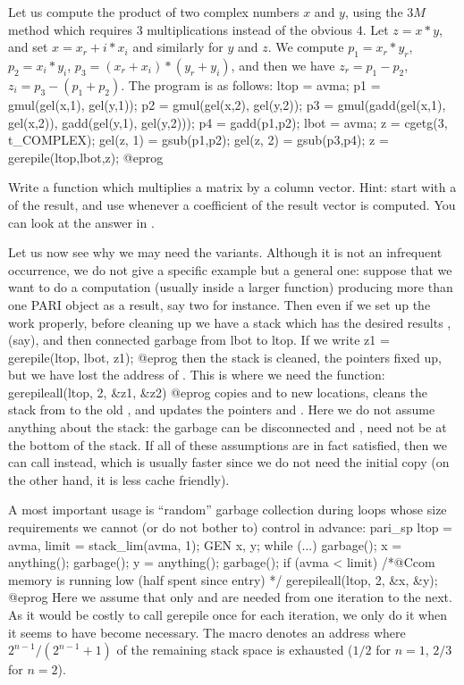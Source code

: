  Let us compute the product of two complex
numbers $x$ and $y$, using the $3M$ method which requires 3 multiplications
instead of the obvious 4. Let $z = x*y$, and set $x = x_r + i*x_i$ and
similarly for $y$ and $z$. We compute $p_1 = x_r*y_r$, $p_2=x_i*y_i$,
$p_3=(x_r+x_i)*(y_r+y_i)$, and then we have $z_r=p_1-p_2$,
$z_i=p_3-(p_1+p_2)$. The program is as follows:
%
\bprog
ltop = avma;
p1 = gmul(gel(x,1), gel(y,1));
p2 = gmul(gel(x,2), gel(y,2));
p3 = gmul(gadd(gel(x,1), gel(x,2)), gadd(gel(y,1), gel(y,2)));
p4 = gadd(p1,p2);
lbot = avma; z = cgetg(3, t_COMPLEX);
gel(z, 1) = gsub(p1,p2);
gel(z, 2) = gsub(p3,p4); z = gerepile(ltop,lbot,z);
@eprog

 Write a function which multiplies a matrix by a column
vector. Hint: start with a  of the result, and use 
whenever a coefficient of the result vector is computed. You can look at the
answer in .


Let us now see why we may need the  variants. Although it
is not an infrequent occurrence, we do not give a specific example but a
general one: suppose that we want to do a computation (usually inside a
larger function) producing more than one PARI object as a result, say two for
instance. Then even if we set up the work properly, before cleaning up we
have a stack which has the desired results ,  (say), and
then connected garbage from lbot to ltop. If we write
\bprog
  z1 = gerepile(ltop, lbot, z1);
@eprog\noindent
then the stack is cleaned, the pointers fixed up, but we have lost the
address of . This is where we need the 
function:
\bprog
  gerepileall(ltop, 2, &z1, &z2)
@eprog
\noindent copies  and  to new locations, cleans the stack
from  to the old , and updates the pointers  and
. Here we do not assume anything about the stack: the garbage can be
disconnected and ,  need not be at the bottom of the stack.
If all of these assumptions are in fact satisfied, then we can call
 instead, which is usually faster since we do not need
the initial copy (on the other hand, it is less cache friendly).

A most important usage is ``random'' garbage collection during loops
whose size requirements we cannot (or do not bother to) control in advance:
\bprog
  pari_sp ltop = avma, limit = stack_lim(avma, 1);
  GEN x, y;
  while (...)
  {
    garbage(); x = anything();
    garbage(); y = anything(); garbage();
    if (avma < limit) /*@Ccom memory is running low (half spent since entry) */
      gerepileall(ltop, 2, &x, &y);
  }
@eprog
\noindent Here we assume that only  and  are needed from one
iteration to the next. As it would be costly to call gerepile once for each
iteration, we only do it when it seems to have become necessary. The macro
 denotes an address where $2^{n-1} /
(2^{n-1}+1)$ of the remaining stack space is exhausted ($1/2$ for $n=1$,
$2/3$ for $n=2$).

